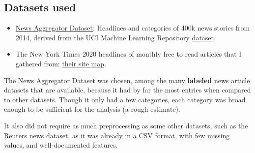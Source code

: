 \documentclass[11pt]{article}
\begin{document}
\subsection*{Datasets used}

\begin{itemize}
\item
\href{https://www.kaggle.com/uciml/news-aggregator-dataset}
{News Aggregator Dataset}:
Headlines and categories of 400k news stories from 2014,
derived from the UCI Machine Learning Repository
\href{http://archive.ics.uci.edu/ml/datasets/News+Aggregator}{dataset}.
\item
The New York Times 2020 headlines of monthly free to read articles that I
gathered from:
\href{https://spiderbites.nytimes.com/2020/}
{their site map}.
\end{itemize}

The News Aggregator Dataset was chosen, among the many \textbf{labeled} news
article datasets that are available, because it had by far the most entries
when compared to other datasets. Though it only had a few categories, each
category was broad enough to be sufficient for the analysis (a rough
estimate).

It also did not require as much preprocessing as some other datasets, such 
as the Reuters news dataset, as it was already in a CSV format, with few
missing values, and well-documented features.
\end{document}
